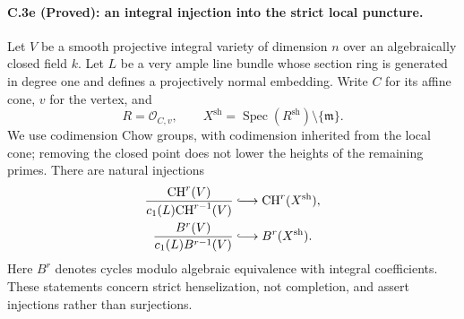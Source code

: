 \paragraph{C.3e (Proved): an integral injection into the strict local puncture.}
Let $V$ be a smooth projective integral variety of dimension $n$ over
an algebraically closed field $k$. Let $L$ be a very ample line bundle
whose section ring is generated in degree one and defines a
projectively normal embedding. Write $C$ for its affine cone, $v$ for
the vertex, and
\[
 R=\mathcal O_{C,v},\qquad
 X^{\mathrm{sh}}=\operatorname{Spec}(R^{\mathrm{sh}})
                    \setminus\{\mathfrak m\}.
\]
We use codimension Chow groups, with codimension inherited from the
local cone; removing the closed point does not lower the heights of
the remaining primes. There are natural injections
\begin{equation}\label{eq:C3-strict-cone-injection}
\begin{aligned}
 \frac{\mathrm{CH}^r(V)}{c_1(L)\mathrm{CH}^{r-1}(V)}
       &\lhook\joinrel\longrightarrow\mathrm{CH}^r(X^{\mathrm{sh}}),\\
 \frac{B^r(V)}{c_1(L)B^{r-1}(V)}
       &\lhook\joinrel\longrightarrow B^r(X^{\mathrm{sh}}).
\end{aligned}
\end{equation}
Here $B^r$ denotes cycles modulo algebraic equivalence with integral
coefficients. These statements concern strict henselization, not
completion, and assert injections rather than surjections.

